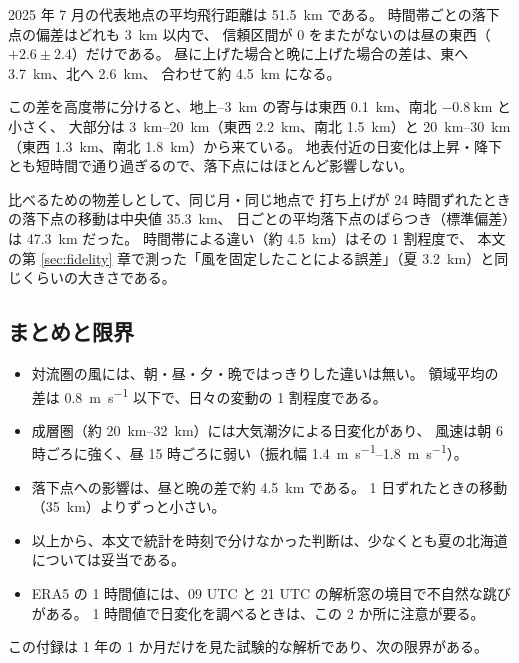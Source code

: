 2025 年 7 月の代表地点の平均飛行距離は \SI{51.5}{\kilo\metre} である。
時間帯ごとの落下点の偏差はどれも \SI{3}{\kilo\metre} 以内で、
信頼区間が 0 をまたがないのは昼の東西（$+2.6 \pm 2.4$）だけである。
昼に上げた場合と晩に上げた場合の差は、東へ \SI{3.7}{\kilo\metre}、北へ \SI{2.6}{\kilo\metre}、
合わせて約 \SI{4.5}{\kilo\metre} になる。

この差を高度帯に分けると、地上--\SI{3}{\kilo\metre} の寄与は東西 \SI{0.1}{\kilo\metre}、南北 $-\SI{0.8}{\kilo\metre}$ と小さく、
大部分は \SIrange{3}{20}{\kilo\metre}（東西 \SI{2.2}{\kilo\metre}、南北 \SI{1.5}{\kilo\metre}）と
\SIrange{20}{30}{\kilo\metre}（東西 \SI{1.3}{\kilo\metre}、南北 \SI{1.8}{\kilo\metre}）から来ている。
地表付近の日変化は上昇・降下とも短時間で通り過ぎるので、落下点にはほとんど影響しない。

比べるための物差しとして、同じ月・同じ地点で
打ち上げが 24 時間ずれたときの落下点の移動は中央値 \SI{35.3}{\kilo\metre}、
日ごとの平均落下点のばらつき（標準偏差）は \SI{47.3}{\kilo\metre} だった。
時間帯による違い（約 \SI{4.5}{\kilo\metre}）はその 1 割程度で、
本文の第 \ref{sec:fidelity} 章で測った「風を固定したことによる誤差」（夏 \SI{3.2}{\kilo\metre}）と同じくらいの大きさである。

\subsection{まとめと限界}

\begin{itemize}
  \item 対流圏の風には、朝・昼・夕・晩ではっきりした違いは無い。
        領域平均の差は \SI{0.8}{\metre\per\second} 以下で、日々の変動の 1 割程度である。
  \item 成層圏（約 \SIrange{20}{32}{\kilo\metre}）には大気潮汐による日変化があり、
        風速は朝 6 時ごろに強く、昼 15 時ごろに弱い（振れ幅 \SIrange{1.4}{1.8}{\metre\per\second}）。
  \item 落下点への影響は、昼と晩の差で約 \SI{4.5}{\kilo\metre} である。
        1 日ずれたときの移動（\SI{35}{\kilo\metre}）よりずっと小さい。
  \item 以上から、本文で統計を時刻で分けなかった判断は、少なくとも夏の北海道については妥当である。
  \item ERA5 の 1 時間値には、09 UTC と 21 UTC の解析窓の境目で不自然な跳びがある。
        1 時間値で日変化を調べるときは、この 2 か所に注意が要る。
\end{itemize}

この付録は 1 年の 1 か月だけを見た試験的な解析であり、次の限界がある。

